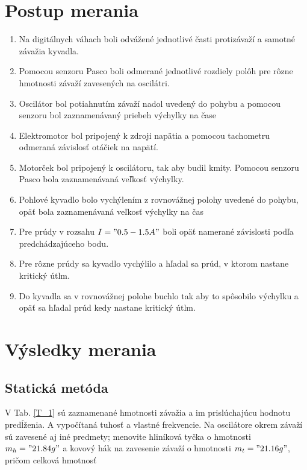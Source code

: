\documentclass[a4paper,10pt]{article}
\begin{document}
\section{Postup merania}
\begin{enumerate}
\item Na digitálnych váhach boli odvážené jednotlivé časti protizávaží a samotné závažia kyvadla.
\item Pomocou senzoru Pasco boli odmerané jednotlivé rozdiely polôh pre rôzne hmotnosti závaží zavesených na oscilátri.
\item Oscilátor bol potiahnutím závaží nadol uvedený do pohybu a pomocou senzoru bol zaznamenávaný priebeh výchylky na čase
\item Elektromotor bol pripojený k zdroji napätia a pomocou tachometru odmeraná závislosť otáčiek na napätí. 
\item Motorček bol pripojený k oscilátoru, tak aby budil kmity. Pomocou senzoru Pasco bola zaznamenávaná veľkosť výchylky.
\item Pohlové kyvadlo bolo vychýlením z rovnovážnej polohy uvedené do pohybu, opäť bola zaznamenávaná veľkosť výchylky na čas
\item Pre prúdy v rozsahu $I= "0.5-1.5 A"$ boli opäť namerané závislosti podľa predchádzajúceho bodu.
\item Pre rôzne prúdy sa kyvadlo vychýlilo a hľadal sa prúd, v ktorom nastane kritický útlm.
\item Do kyvadla sa v rovnovážnej polohe buchlo tak aby to spôsobilo výchylku a opäť sa hľadal prúd kedy nastane kritický útlm.
\end{enumerate}

\section{Výsledky merania}
\subsection{Statická metóda}

V Tab. \ref{T_1} sú zaznamenané hmotnosti závažia a im prislúchajúcu hodnotu predĺženia. A vypočítaná tuhosť a vlastné frekvencie.
Na oscilátore okrem závaží sú zavesené aj iné predmety; menovite hliníková tyčka o hmotnosti $m_h="21.84 g"$ a kovový hák na zavesenie závaží o hmotnosti $m_t="21.16 g"$, pričom celková hmotnosť 
\end{document}
